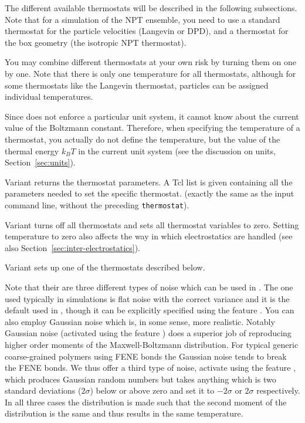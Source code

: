 The different available thermostats will be described in the following
subsections. Note that for a simulation of the NPT ensemble, you need
to use a standard thermostat for the particle velocities (\eg Langevin
or DPD), and a thermostat for the box geometry (\eg the isotropic NPT
thermostat).

You may combine different thermostats at your own risk by turning them
on one by one. Note that there is only one temperature for all
thermostats, although for some thermostats like the Langevin thermostat,
particles can be assigned individual temperatures.

Since \es{} does not enforce a particular unit system, it cannot know
about the current value of the Boltzmann constant. Therefore, when
specifying the temperature of a thermostat, you actually do not define
the temperature, but the value of the thermal energy $k_B T$ in the
current unit system (see the discussion on units, Section~\ref{sec:units}).

Variant  returns the thermostat parameters. A Tcl list is
given containing all the parameters needed to set the specific
thermostat. (exactly the same as the input command line, without the
preceding \texttt{thermostat}).

Variant  turns off all thermostats and sets all thermostat 
variables to zero. Setting temperature to zero also affects the way in which 
electrostatics are handled (see also Section~\ref{sec:inter-electrostatics}).

Variant  sets up one of the thermostats described below.

Note that their are three different types of noise which can be used
in \es. The one used typically in simulations is flat noise with the
correct variance and it is the default used in \es, though it can be
explicitly specified using the feature .  You can
also employ Gaussian noise which is, in some sense, more realistic.
Notably Gaussian noise (activated using the feature
) does a superior job of reproducing higher order
moments of the Maxwell-Boltzmann distribution.  For typical generic
coarse-grained polymers using FENE bonds the Gaussian noise tends to
break the FENE bonds.  We thus offer a third type of noise, activate
using the feature , which produces Gaussian
random numbers but takes anything which is two standard deviations
($2\sigma$) below or above zero and set it to $-2\sigma$ or $2\sigma$
respectively. In all three cases the distribution is made such that
the second moment of the distribution is the same and thus results in
the same temperature.

